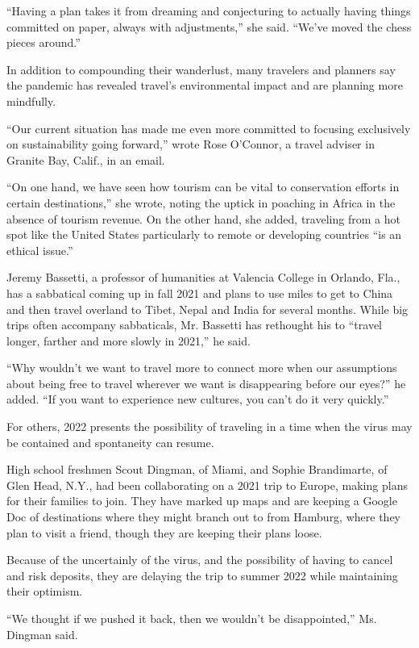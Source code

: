 ``Having a plan takes it from dreaming and conjecturing to actually
having things committed on paper, always with adjustments,'' she said.
``We've moved the chess pieces around.''

In addition to compounding their wanderlust, many travelers and planners
say the pandemic has revealed travel's environmental impact and are
planning more mindfully.

``Our current situation has made me even more committed to focusing
exclusively on sustainability going forward,'' wrote Rose O'Connor, a
travel adviser in Granite Bay, Calif., in an email.

``On one hand, we have seen how tourism can be vital to conservation
efforts in certain destinations,'' she wrote, noting the uptick in
poaching in Africa in the absence of tourism revenue. On the other hand,
she added, traveling from a hot spot like the United States particularly
to remote or developing countries ``is an ethical issue.''

Jeremy Bassetti, a professor of humanities at Valencia College in
Orlando, Fla., has a sabbatical coming up in fall 2021 and plans to use
miles to get to China and then travel overland to Tibet, Nepal and India
for several months. While big trips often accompany sabbaticals, Mr.
Bassetti has rethought his to ``travel longer, farther and more slowly
in 2021,'' he said.

``Why wouldn't we want to travel more to connect more when our
assumptions about being free to travel wherever we want is disappearing
before our eyes?'' he added. ``If you want to experience new cultures,
you can't do it very quickly.''

For others, 2022 presents the possibility of traveling in a time when
the virus may be contained and spontaneity can resume.

High school freshmen Scout Dingman, of Miami, and Sophie Brandimarte, of
Glen Head, N.Y., had been collaborating on a 2021 trip to Europe, making
plans for their families to join. They have marked up maps and are
keeping a Google Doc of destinations where they might branch out to from
Hamburg, where they plan to visit a friend, though they are keeping
their plans loose.

Because of the uncertainly of the virus, and the possibility of having
to cancel and risk deposits, they are delaying the trip to summer 2022
while maintaining their optimism.

``We thought if we pushed it back, then we wouldn't be disappointed,''
Ms. Dingman said.

